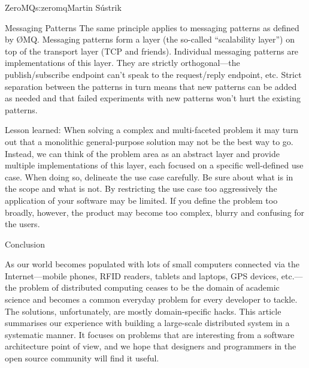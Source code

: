 \begin{aosachapter}{ZeroMQ}{s:zeromq}{Martin S\'{u}strik}
\begin{aosasect1}{Messaging Patterns}
The same principle applies to messaging patterns as defined by
{\O}MQ. Messaging patterns form a layer (the so-called ``scalability layer'')
on top of the transport layer (TCP and friends). Individual messaging
patterns are implementations of this layer. They are strictly
orthogonal---the publish/subscribe endpoint can't speak to the request/reply
endpoint, etc. Strict separation between the patterns in turn means
that new patterns can be added as needed and that failed experiments
with new patterns won't hurt the existing patterns.

Lesson learned: When solving a complex and multi-faceted problem it
may turn out that a monolithic general-purpose solution may not be the
best way to go. Instead, we can think of the problem area as an
abstract layer and provide multiple implementations of this layer,
each focused on a specific well-defined use case. When doing so,
delineate the use case carefully. Be sure about what is in the scope
and what is not. By restricting the use case too aggressively the
application of your software may be limited. If you define the problem
too broadly, however, the product may become too complex, blurry and
confusing for the users.

\end{aosasect1}

\begin{aosasect1}{Conclusion}

As our world becomes populated with lots of small computers connected
via the Internet---mobile phones, RFID readers, tablets and
laptops, GPS devices, etc.---the problem of distributed computing ceases
to be the domain of academic science and becomes a common everyday
problem for every developer to tackle. The solutions, unfortunately,
are mostly domain-specific hacks. This article summarises our
experience with building a large-scale distributed system in a
systematic manner. It focuses on problems that are interesting from
a software architecture point of view, and we hope that designers and
programmers in the open source community will find it useful.

\end{aosasect1}

\end{aosachapter}
